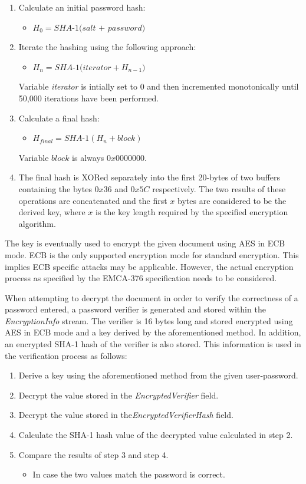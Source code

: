 \documentclass[11pt,oneside]{fithesis2}
\begin{document}
\begin{enumerate}
\item{Calculate an initial password hash:}
	\begin{itemize}
		\item{$H_0 =\textit{SHA-1(salt + password)}$}
	\end{itemize}
\item{Iterate the hashing using the following approach: 
	\begin{itemize}
		\item{$H_n = \textit{SHA-1(iterator} + H_{n-1})$}
	\end{itemize}
	Variable \textit{iterator} is intially set to 0 and then incremented monotonically until 50,000 iterations have been performed.}
\item{Calculate a final hash:
	\begin{itemize}
		\item{$H_{final} = \textit{SHA-1}(H_n + block)$}
	\end{itemize}
	Variable $block$ is always $0x0000000$.}
\item{The final hash is XORed separately into the first 20-bytes of two buffers containing the bytes $0x36$ and $0x5C$ respectively. The two results of these operations are concatenated and the first $x$ bytes are considered to be the derived key, where $x$ is the key length required by the specified encryption algorithm.}
\end{enumerate}

The key is eventually used to encrypt the given document using AES in ECB mode. ECB is the only supported encryption mode for standard encryption. This implies ECB specific attacks may be applicable. However, the actual encryption process as specified by the EMCA-376 specification needs to be considered. 

When attempting to decrypt the document in order to verify the correctness of a password entered, a password verifier is generated and stored within the \textit{EncryptionInfo} stream. The verifier is 16 bytes long and stored encrypted using AES in ECB mode and a key derived by the aforementioned method. In addition, an encrypted SHA-1 hash of the verifier is also stored. This information is used in the verification process as follows:

\begin{enumerate}
\setlength\itemsep{0.1em}
\item{Derive a key using the aforementioned method from the given user-password.}
\item{Decrypt the value stored in the \textit{EncryptedVerifier} field.}
\item{Decrypt the value stored in the\textit{EncryptedVerifierHash} field.}
\item{Calculate the SHA-1 hash value of the decrypted value calculated in step 2.}
\item{Compare the results of step 3 and step 4. 
	\begin{itemize}
		\item{In case the two values match the password is correct.}
	\end{itemize}}
\end{enumerate}
\end{document}

